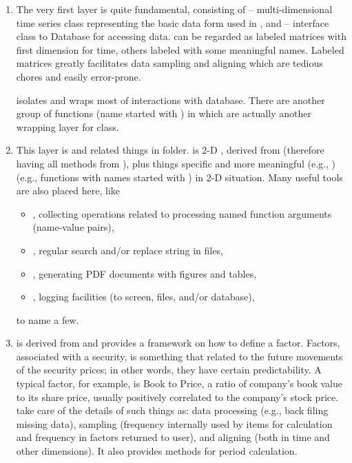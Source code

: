 \begin{enumerate}
   \item The very first layer is quite fundamental, consisting of  -- 
         multi-dimensional time series class representing the basic data form used in \matlab{},
         and  -- interface class to Database for accessing data.
          can be regarded as labeled matrices with first dimension for time, others labeled with some meaningful names. 
         Labeled matrices greatly facilitates data sampling and aligning which are tedious chores and easily error-prone.

          isolates and wraps most of interactions with database.
         There are another group of functions (name started with ) in 
         which are actually another wrapping layer for  class.
           
   \item This layer is  and related things in  folder.
          is 2-D , derived from  (therefore having all methods from ),
         plus things specific and more meaningful (e.g., ) 
         (e.g., functions with names started with ) in 2-D situation.
         Many useful tools are also placed here, like 
         \begin{itemize}
           \item {}, collecting operations related to processing named function arguments (name-value pairs),
           \item {}, regular search and/or replace string in files,
           \item {}, generating PDF documents with figures and tables,
           \item {}, logging facilities (to screen, files, and/or database),
         \end{itemize}
         to name a few.

   \item {} is derived from  and provides a framework on how to define a factor.
        Factors, associated with a security, is something that related to the future movements of the security prices;
        in other words, they have certain predictability.
        A typical factor, for example, is Book to Price, a ratio of company's book value to its share price,
        usually positively correlated to the company's stock price.
         take care of the details of such things as: 
        data processing (e.g., back filing missing data), 
        sampling (frequency internally used by items for calculation and frequency in factors returned to user),
        and aligning (both in time and other dimensions).
        It also provides methods for period calculation.


\end{enumerate}
